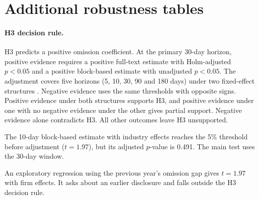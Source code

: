 \section{Additional robustness tables}
\label{sec:app_robust}



\paragraph{H3 decision rule.} H3 predicts a positive omission coefficient. At the primary 30-day horizon, positive evidence requires a positive full-text estimate with Holm-adjusted $p<0.05$ and a positive block-based estimate with unadjusted $p<0.05$. The adjustment covers five horizons (5, 10, 30, 90 and 180 days) under two fixed-effect structures \parencite{holm1979}. Negative evidence uses the same thresholds with opposite signs. Positive evidence under both structures supports H3, and positive evidence under one with no negative evidence under the other gives partial support. Negative evidence alone contradicts H3. All other outcomes leave H3 unsupported.



The 10-day block-based estimate with industry effects reaches the 5\% threshold before adjustment ($t=1.97$), but its adjusted $p$-value is 0.491. The main test uses the 30-day window.



An exploratory regression using the previous year's omission gap gives $t=1.97$ with firm effects. It asks about an earlier disclosure and falls outside the H3 decision rule.
